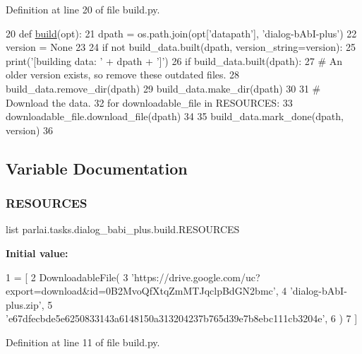 Definition at line 20 of file build.\+py.


\begin{DoxyCode}
20 \textcolor{keyword}{def }\hyperlink{namespacedialog__babi__feedback_1_1build_a7a9d289f7493a5ded13c4b7f071b6184}{build}(opt):
21     dpath = os.path.join(opt[\textcolor{stringliteral}{'datapath'}], \textcolor{stringliteral}{'dialog-bAbI-plus'})
22     version = \textcolor{keywordtype}{None}
23 
24     \textcolor{keywordflow}{if} \textcolor{keywordflow}{not} build\_data.built(dpath, version\_string=version):
25         print(\textcolor{stringliteral}{'[building data: '} + dpath + \textcolor{stringliteral}{']'})
26         \textcolor{keywordflow}{if} build\_data.built(dpath):
27             \textcolor{comment}{# An older version exists, so remove these outdated files.}
28             build\_data.remove\_dir(dpath)
29         build\_data.make\_dir(dpath)
30 
31         \textcolor{comment}{# Download the data.}
32         \textcolor{keywordflow}{for} downloadable\_file \textcolor{keywordflow}{in} RESOURCES:
33             downloadable\_file.download\_file(dpath)
34 
35         build\_data.mark\_done(dpath, version)
36 \end{DoxyCode}


\subsection{Variable Documentation}
\mbox{\label{namespaceparlai_1_1tasks_1_1dialog__babi__plus_1_1build_a1bb4d3fa841149fd8c1d8c16c67cc1da}} 
\subsubsection{\texorpdfstring{R\+E\+S\+O\+U\+R\+C\+ES}{RESOURCES}}
{\footnotesize\ttfamily list parlai.\+tasks.\+dialog\+\_\+babi\+\_\+plus.\+build.\+R\+E\+S\+O\+U\+R\+C\+ES}

{\bfseries Initial value\+:}
\begin{DoxyCode}
1 =  [
2     DownloadableFile(
3         \textcolor{stringliteral}{'https://drive.google.com/uc?export=download&id=0B2MvoQfXtqZmMTJqclpBdGN2bmc'},
4         \textcolor{stringliteral}{'dialog-bAbI-plus.zip'},
5         \textcolor{stringliteral}{'e67dfecbde5e6250833143a6148150a313204237b765d39e7b8ebc111cb3204e'},
6     )
7 ]
\end{DoxyCode}


Definition at line 11 of file build.\+py.


